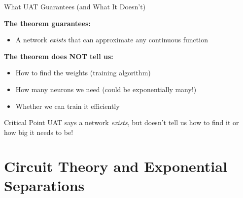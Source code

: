 \documentclass[xcolor=svgnames, 10pt, handout, standalone]{beamer}
\newcommand{\1}{\mathbf{1}}
\begin{document}
\begin{frame}{What UAT Guarantees (and What It Doesn't)}

\textbf{The theorem guarantees:}
\begin{itemize}
    \item[\checkmark] A network \textit{exists} that can approximate any continuous function
\end{itemize}

\textbf{The theorem does NOT tell us:}
\begin{itemize}
    \item[$\times$] How to find the weights (training algorithm)
    \item[$\times$] How many neurons we need (could be exponentially many!)
    \item[$\times$] Whether we can train it efficiently
\end{itemize}

\begin{alertblock}{Critical Point}
UAT says a network \textit{exists}, but doesn't tell us how to find it or how big it needs to be!
\end{alertblock}
\end{frame}

\section{Circuit Theory and Exponential Separations}



\end{document}
